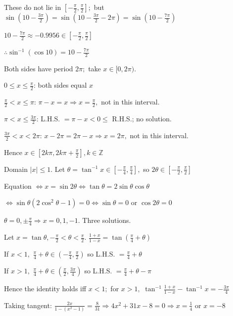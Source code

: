   These do not lie in $\left[-\frac{\pi}{2}, \frac{\pi}{2}\right];$ but $\sin\left(10 - \frac{3\pi}{2}\right) = \sin\left(10 -
  \frac{3\pi}{2} - 2\pi\right) = \sin\left(10 - \frac{7\pi}{2}\right)$

  $10 - \frac{7\pi}{2}\approx -0.9956\in\left[-\frac{\pi}{2}, \frac{\pi}{2}\right]$

  $\therefore \sin^{-1}(\cos10) = 10 - \frac{7\pi}{2}$

\item Both sides have period $2\pi;$ take $x\in[0, 2\pi).$

  $0\leq x\leq \frac{\pi}{2}$: both sides equal $x$

  $\frac{\pi}{2} < x\leq \pi$: $\pi - x = x \Rightarrow x = \frac{\pi}{2},$ not in this interval.

  $\pi < x\leq \frac{3\pi}{2}$: L.H.S. $= \pi - x < 0\leq$ R.H.S.; no solution.

  $\frac{3\pi}{2} < x < 2\pi$: $x - 2\pi = 2\pi - x \Rightarrow x = 2\pi,$ not in this interval.

  Hence $x\in\left[2k\pi, 2k\pi + \frac{\pi}{2}\right], k\in\mathbb{Z}$

\item Domain $|x|\leq 1.$ Let $\theta = \tan^{-1}x\in\left[-\frac{\pi}{4}, \frac{\pi}{4}\right],$ so $2\theta\in\left[-\frac{\pi}{2},
  \frac{\pi}{2}\right]$

  Equation $\iff x = \sin2\theta \iff \tan\theta = 2\sin\theta\cos\theta$

  $\iff \sin\theta(2\cos^2\theta - 1) = 0 \iff \sin\theta = 0$ or $\cos2\theta = 0$

  $\theta = 0, \pm\frac{\pi}{4} \Rightarrow x = 0, 1, -1.$ Three solutions.

\item Let $x = \tan\theta, -\frac{\pi}{2} < \theta < \frac{\pi}{2}.$ $\frac{1 + x}{1 - x} = \tan\left(\frac{\pi}{4} + \theta\right)$

  If $x < 1,$ $\frac{\pi}{4} + \theta\in\left(-\frac{\pi}{4}, \frac{\pi}{2}\right)$ so L.H.S. $= \frac{\pi}{4} + \theta$

  If $x > 1,$ $\frac{\pi}{4} + \theta\in\left(\frac{\pi}{2}, \frac{3\pi}{4}\right)$ so L.H.S. $= \frac{\pi}{4} + \theta - \pi$

  Hence the identity holds iff $x < 1;$ for $x > 1,$ $\tan^{-1}\frac{1 + x}{1 - x} - \tan^{-1}x = -\frac{3\pi}{4}$

\item Taking tangent: $\frac{2x}{1 - (x^2 - 1)} = \frac{8}{31} \Rightarrow 4x^2 + 31x - 8 = 0 \Rightarrow x = \frac{1}{4}$ or $x =
  -8$

